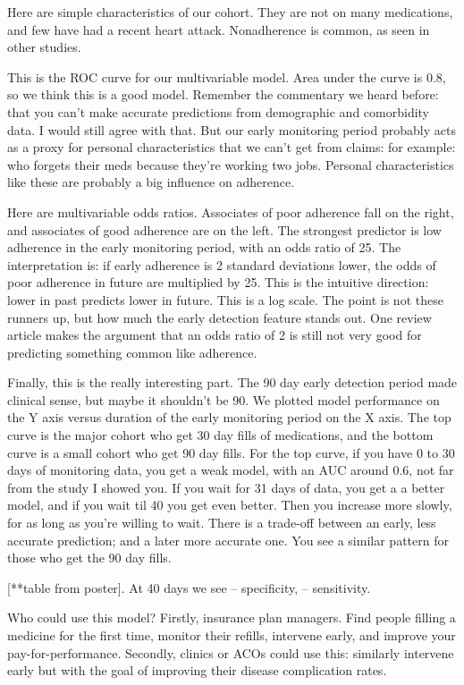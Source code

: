\documentclass[12pt]{report}
\begin{document}
\begin{large}
Here are simple characteristics of our cohort. They are not on many
medications, and few have had a recent heart attack. Nonadherence is
common, as seen in other studies.

This is the ROC curve for our multivariable model. Area under the
curve is 0.8, so we think this is a good model. Remember the
commentary we heard before: that you can't make accurate predictions
from demographic and comorbidity data. I would still agree with that.
But our early monitoring period probably acts as a proxy for personal
characteristics that we can't get from claims: for example: who
forgets their meds because they're working two jobs. Personal
characteristics like these are probably a big influence on adherence.

Here are multivariable odds ratios. Associates of poor adherence fall
on the right, and associates of good adherence are on the left. The
strongest predictor is low adherence in the early monitoring period,
with an odds ratio of 25. The interpretation is: if early adherence is
2 standard deviations lower, the odds of poor adherence in future are
multiplied by 25. This is the intuitive direction: lower in past
predicts lower in future. This is a log scale. The point is not these
runners up, but how much the early detection feature stands out. One
review article makes the argument that an odds ratio of 2 is still not
very good for predicting something common like adherence.

Finally, this is the really interesting part. The 90 day early
detection period made clinical sense, but maybe it shouldn't be 90. We
plotted model performance on the Y axis versus duration of the early
monitoring period on the X axis. The top curve is the major cohort who
get 30 day fills of medications, and the bottom curve is a small
cohort who get 90 day fills. For the top curve, if you have 0 to 30
days of monitoring data, you get a weak model, with an AUC around 0.6,
not far from the study I showed you. If you wait for 31 days of data,
you get a a better model, and if you wait til 40 you get even better.
Then you increase more slowly, for as long as you're willing to wait.
There is a trade-off between an early, less accurate prediction; and a
later more accurate one. You see a similar pattern for those who get
the 90 day fills.

[**table from poster]. At 40 days we see -- specificity, --
sensitivity.

Who could use this model? Firstly, insurance plan managers. Find
people filling a medicine for the first time, monitor their refills,
intervene early, and improve your pay-for-performance. Secondly,
clinics or ACOs could use this: similarly intervene early but with the
goal of improving their disease complication rates.


\end{large}
\end{document}
